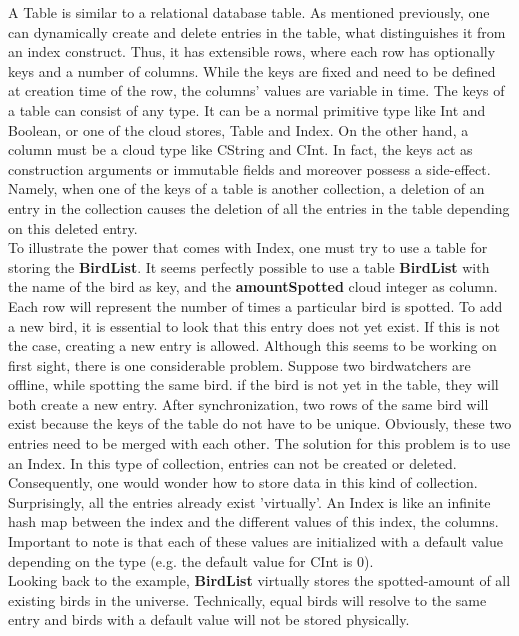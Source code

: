 \documentclass[a4paper,12pt]{report}
\begin{document}
A \textcolor{codeblue}{Table} is similar to a relational database table. As mentioned previously, one can dynamically create and delete entries in the table, what distinguishes it from an index construct. Thus, it has extensible rows, where each row has optionally keys and a number of columns. While the keys are fixed and need to be defined at creation time of the row, the columns' values are variable in time. The keys of a table can consist of any type. It can be a normal primitive type like \textcolor{codedarkblue}{Int} and \textcolor{codedarkblue}{Boolean}, or one of the cloud stores, \textcolor{codeblue}{Table} and \textcolor{codeblue}{Index}. On the other hand, a column must be a cloud type like \textcolor{codedarkblue}{CString} and \textcolor{codedarkblue}{CInt}. In fact, the keys act as construction arguments or immutable fields and moreover possess a side-effect. Namely, when one of the keys of a table is another collection, a deletion of an entry in the collection causes the deletion of all the entries in the table depending on this deleted entry. \\

To illustrate the power that comes with \textcolor{codeblue}{Index}, one must try to use a table for storing the \textbf{BirdList}. It seems perfectly possible to use a table \textbf{BirdList} with the name of the bird as key, and the \textbf{amountSpotted} cloud integer as column. Each row will represent the number of times a particular bird is spotted. To add a new bird, it is essential to look that this entry does not yet exist. If this is not the case, creating a new entry is allowed. Although this seems to be working on first sight, there is one considerable problem. Suppose two birdwatchers are offline, while spotting the same bird. if the bird is not yet in the table, they will both create a new entry. After synchronization, two rows of the same bird will exist because the keys of the table do not have to be unique. Obviously, these two entries need to be merged with each other. The solution for this problem is to use an \textcolor{codeblue}{Index}. In this type of collection, entries can not be created or deleted. Consequently, one would wonder how to store data in this kind of collection. Surprisingly, all the entries already exist 'virtually'. An \textcolor{codeblue}{Index} is like an infinite hash map between the index and the different values of this index, the columns. Important to note is that each of these values are initialized with a default value depending on the type (e.g. the default value for \textcolor{codedarkblue}{CInt} is 0). \\
Looking back to the example, \textbf{BirdList} virtually stores the spotted-amount of all existing birds in the universe. Technically, equal birds will resolve to the same entry and birds with a default value will not be stored physically. \\
\end{document}
